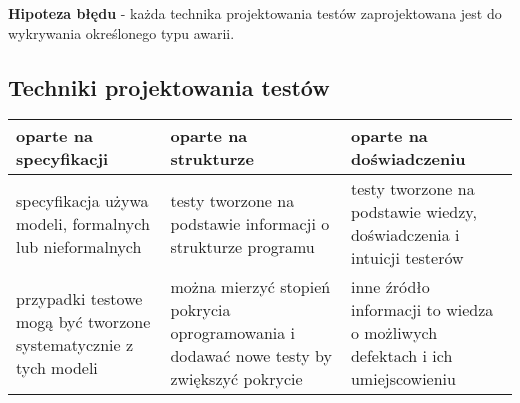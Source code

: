 \documentclass[../main.tex]{subfiles}
\begin{document}
    \textbf{Hipoteza błędu} - każda technika projektowania testów zaprojektowana jest do
    wykrywania określonego typu awarii.

    \subsection{Techniki projektowania testów}

    \begin{table}[H]
        \begin{center}
            \begin{tabular}{ p{5cm} p{5cm} p{5cm} }
                \toprule
                \textbf{oparte na specyfikacji} & \textbf{oparte na strukturze} & \textbf{oparte na doświadczeniu} \\
                \toprule
                specyfikacja używa
                modeli, formalnych
                lub nieformalnych
                &
                testy tworzone na
                podstawie informacji
                o strukturze programu
                &
                testy tworzone na
                podstawie wiedzy,
                doświadczenia i
                intuicji testerów \\

                przypadki testowe
                mogą być tworzone
                systematycznie z
                tych modeli
                &
                można mierzyć
                stopień pokrycia
                oprogramowania i
                dodawać nowe testy
                by zwiększyć pokrycie
                &
                inne źródło informacji
                to wiedza o
                możliwych defektach i
                ich umiejscowieniu \\


\end{tabular}
\end{center}
\end{table}
\end{document}
